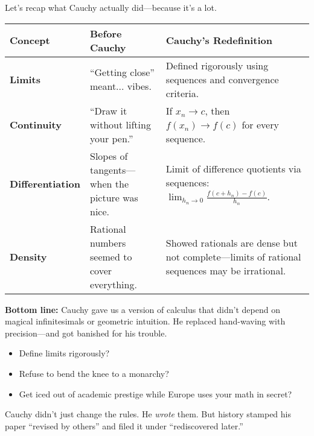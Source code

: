Let’s recap what Cauchy actually did—because it’s a lot.

\begin{center}
\renewcommand{\arraystretch}{1.4}
\begin{tabular}{|p{3.5cm}|p{5cm}|p{5cm}|}
\hline
\textbf{Concept} & \textbf{Before Cauchy} & \textbf{Cauchy’s Redefinition} \\
\hline
\textbf{Limits} & “Getting close” meant... vibes. & Defined rigorously using sequences and convergence criteria. \\
\hline
\textbf{Continuity} & “Draw it without lifting your pen.” & If $x_n \to c$, then $f(x_n) \to f(c)$ for every sequence. \\
\hline
\textbf{Differentiation} & Slopes of tangents—when the picture was nice. & Limit of difference quotients via sequences: $\displaystyle \lim_{h_n \to 0} \frac{f(c + h_n) - f(c)}{h_n}$. \\
\hline
\textbf{Density} & Rational numbers seemed to cover everything. & Showed rationals are dense but not complete—limits of rational sequences may be irrational. \\
\hline
\end{tabular}
\end{center}


\textbf{Bottom line:}  
Cauchy gave us a version of calculus that didn’t depend on magical infinitesimals or geometric intuition. He replaced hand-waving with precision—and got banished for his trouble.

\begin{itemize}
  \item Define limits rigorously? \checkmark
  \item Refuse to bend the knee to a monarchy? \checkmark
  \item Get iced out of academic prestige while Europe uses your math in secret? \checkmark\checkmark
\end{itemize}

Cauchy didn’t just change the rules. He \textit{wrote} them. But history stamped his paper “revised by others” and filed it under “rediscovered later.”



